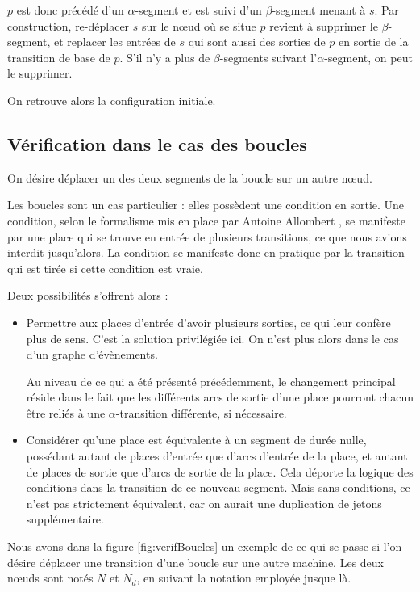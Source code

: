 $p$ est donc précédé d'un $\alpha$-segment et est suivi d'un $\beta$-segment menant à $s$.
Par construction, re-déplacer $s$ sur le nœud où se situe $p$ revient à supprimer le $\beta$-segment, et replacer les entrées de $s$ qui sont aussi des sorties de $p$ en sortie de la transition de base de $p$. S'il n'y a plus de $\beta$-segments suivant l'$\alpha$-segment, on peut le supprimer.

On retrouve alors la configuration initiale.

\subsection{Vérification dans le cas des boucles}
On désire déplacer un des deux segments de la boucle sur un autre nœud.

Les boucles sont un cas particulier : elles possèdent une condition en sortie.
Une condition, selon le formalisme mis en place par Antoine Allombert \cite[p.~167--170]{allombert2009aspects}, se manifeste par une place qui se trouve en entrée de plusieurs transitions, ce que nous avions interdit jusqu'alors. La condition se manifeste donc en pratique par la transition qui est tirée si cette condition est vraie.

Deux possibilités s'offrent alors : 
\begin{itemize}
\item Permettre aux places d'entrée d'avoir plusieurs sorties, ce qui leur confère plus de sens. C'est la solution privilégiée ici. On n'est plus alors dans le cas d'un graphe d'évènements.

Au niveau de ce qui a été présenté précédemment, le changement principal réside dans le fait que les différents arcs de sortie d'une place pourront chacun être reliés à une $\alpha$-transition différente, si nécessaire.
\item Considérer qu'une place est équivalente à un segment de durée nulle, possédant autant de places d'entrée que d'arcs d'entrée de la place, et autant de places de sortie que d'arcs de sortie de la place. Cela déporte la logique des conditions dans la transition de ce nouveau segment. Mais sans conditions, ce n'est pas strictement équivalent, car on aurait une duplication de jetons supplémentaire.
\end{itemize}

Nous avons dans la figure \ref{fig:verifBoucles} un exemple de ce qui se passe si l'on désire déplacer une transition d'une boucle sur une autre machine. Les deux nœuds sont notés $N$ et $N_d$, en suivant la notation employée jusque là.

